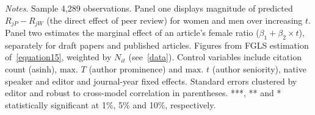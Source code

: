 \begin{table}
\begin{threeparttable}
\begin{tablenotes}
            \item \textit{Notes}. Sample 4,289 observations. Panel one displays magnitude of predicted \(R_{jP}-R_{jW}\) (the direct effect of peer review) for women and men over increasing \(t\). Panel two estimates the marginal effect of an article's female ratio (\(\beta_1+\beta_2\times t\)), separately for draft papers and published articles. Figures from FGLS estimation of~\autoref{equation15}, weighted by \(N_{it}\) (see~\autoref{data}). Control variables include citation count (asinh), \(\text{max. }T\) (author prominence) and \(\text{max. }t\) (author seniority), native speaker and editor and journal-year fixed effects. Standard errors clustered by editor and robust to cross-model correlation in parentheses. ***, ** and * statistically significant at 1\%, 5\% and 10\%, respectively.
        \end{tablenotes}
    \end{threeparttable}
\end{table}